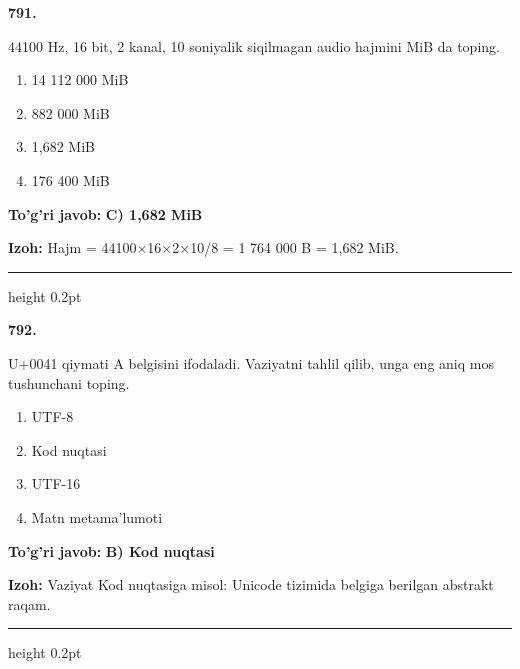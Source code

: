 \documentclass[10pt,a4paper,oneside]{article}
\begin{document}
\noindent\textbf{\color{ink}791.}
\par
44100 Hz, 16 bit, 2 kanal, 10 soniyalik siqilmagan audio hajmini MiB da toping.
\begin{enumerate}[label=\Alph*),leftmargin=9mm]
\item 14 112 000 MiB
\item 882 000 MiB
\item 1,682 MiB
\item 176 400 MiB
\end{enumerate}
\begin{tcolorbox}[enhanced,breakable,colback=teal!4,colframe=teal!50!black,boxrule=0.5pt,arc=1.1mm,left=3mm,right=3mm,top=1.7mm,bottom=1.7mm,before skip=2mm,after skip=2mm]
\textbf{\color{teal}To'g'ri javob:} \textbf{C) 1,682 MiB}
\par\smallskip
\textbf{Izoh:} Hajm = 44100\ensuremath{\times}16\ensuremath{\times}2\ensuremath{\times}10/8 = 1 764 000 B = 1,682 MiB.
\end{tcolorbox}
\vspace{2mm}\hrule height 0.2pt \vspace{3mm}

\noindent\textbf{\color{ink}792.}
\par
U+0041 qiymati A belgisini ifodaladi. Vaziyatni tahlil qilib, unga eng aniq mos tushunchani toping.
\begin{enumerate}[label=\Alph*),leftmargin=9mm]
\item UTF-8
\item Kod nuqtasi
\item UTF-16
\item Matn metama'lumoti
\end{enumerate}
\begin{tcolorbox}[enhanced,breakable,colback=teal!4,colframe=teal!50!black,boxrule=0.5pt,arc=1.1mm,left=3mm,right=3mm,top=1.7mm,bottom=1.7mm,before skip=2mm,after skip=2mm]
\textbf{\color{teal}To'g'ri javob:} \textbf{B) Kod nuqtasi}
\par\smallskip
\textbf{Izoh:} Vaziyat Kod nuqtasiga misol: Unicode tizimida belgiga berilgan abstrakt raqam.
\end{tcolorbox}
\vspace{2mm}\hrule height 0.2pt \vspace{3mm}
\end{document}
